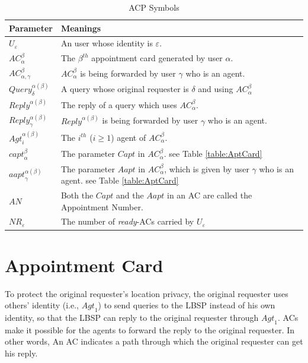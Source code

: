 \begin{table} [hbtp]
\caption{ACP Symbols}
\label{table:ACPSymbols}
\centering
\tabulinesep=2mm
\begin{tabu} to 150 mm {|X[1,c]|X[6,l]|} \hline 
Parameter & Meanings \\ \hline 
${U}_{\varepsilon}$ & An user whose identity is $\varepsilon$. \\ \hline 
${AC}_{\alpha}^{\beta}$ & The $\beta^{th}$ appointment card generated by user $\alpha$. \\ \hline 
${AC}_{{\alpha},{\gamma}}^{\beta}$ & ${AC}_{\alpha}^{\beta}$ is being forwarded by user $\gamma$ who is an agent. \\ \hline 
${Query}_{\delta}^{{\alpha}\left({\beta}\right)}$ & A query whose original requester is $\delta$ and using ${AC}_{\alpha}^{\beta}$ \\ \hline 
${{Reply}}^{{\alpha}\left({\beta}\right)}$ & The reply of a query which uses ${AC}_{\alpha}^{\beta}$. \\ \hline 
${{Reply}}_{\gamma}^{{\alpha}\left({\beta}\right)}$ & ${Reply}^{\alpha\left(\beta\right)}$ is being forwarded by user $\gamma$ who is an agent. \\ \hline 
${{Agt}}_{i}^{{\alpha}\left({\beta}\right)}$ & The $i^{th}$ ($i\geq1$) agent of ${AC}_{\alpha}^{\beta}$. \\ \hline 
${{capt}}_{\alpha}^{\beta}$ & The parameter $Capt$ in ${AC}_\alpha^\beta$. see Table \ref{table:AptCard} \\ \hline 
${{aapt}}_{\gamma}^{{\alpha}\left({\beta}\right)}$ & The parameter $Aapt$ in ${AC}_{\alpha}^{\beta}$, which is given by user $\gamma$ who is an agent. see Table \ref{table:AptCard} \\ \hline 
$AN$ & Both the $Capt$ and the $Aapt$ in an AC are called the Appointment Number. \\ \hline 
${NR}_{\varepsilon}$ & The number of \textit{ready}-ACs carried by ${U}_{\varepsilon}$ \\ \hline 
\end{tabu}
\end{table}

\section{Appointment Card}

\noindent To protect the original requester's location privacy, the original requester uses others' identity (i.e., ${Agt}_1$) to send queries to the LBSP instead of his own identity, so that the LBSP can reply to the original requester through ${Agt}_1$. ACs make it possible for the agents to forward the reply to the original requester. In other words, An AC indicates a path through which the original requester can get his reply. 

